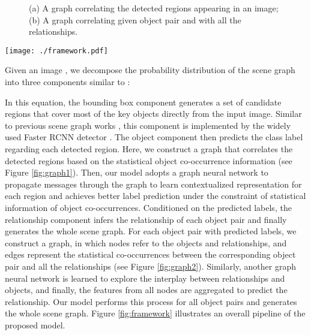 \documentclass[10pt,twocolumn,letterpaper]{article}
\begin{document}
\begin{figure}[!t]
\centering
{}
\caption{(a) A graph correlating the detected regions appearing in an image; (b) A graph correlating given object pair  and  with all the relationships.}
\end{figure}

\begin{figure*}[!t]
   \centering
   \texttt{[image: ./framework.pdf]} \caption{An overall pipeline of the knowledge-embedded routing network. Given an image, we first adopt the Faster RCNN to detect a set of regions. Then, a graph is built to correlate the regions, and a graph neural network is employed to learn contextualized representation to predict the class label for each region. For each object pair with predicted labels, we build another graph to correlate the given object pair with all the possible relationships and employ a graph neural network to infer their relationship. The process is repeated for all object pairs and the scene graph is generated.}
   \label{fig:framework}
\end{figure*}

Given an image , we decompose the probability distribution of the scene graph  into three components similar to \cite{zellers2017neural}:


In this equation, the bounding box component  generates a set of candidate regions that cover most of the key objects directly from the input image. Similar to previous scene graph works \cite{dai2017detecting,zellers2017neural}, this component is implemented by the widely used Faster RCNN detector \cite{ren2015faster}. The object component  then predicts the class label regarding each detected region. Here, we construct a graph that correlates the detected regions based on the statistical object co-occurrence information (see Figure \ref{fig:graph1}). Then, our model adopts a graph neural network \cite{scarselli2009graph,li2016gated} to propagate messages through the graph to learn contextualized representation for each region and achieves better label prediction under the constraint of statistical information of object co-occurrences. Conditioned on the predicted labels, the relationship component  infers the relationship of each object pair and finally generates the whole scene graph. For each object pair with predicted labels, we construct a graph, in which nodes refer to the objects and relationships, and edges represent the statistical co-occurrences between the corresponding object pair and all the relationships (see Figure \ref{fig:graph2}). Similarly, another graph neural network is learned to explore the interplay between relationships and objects, and finally, the features from all nodes are aggregated to predict the relationship. Our model performs this process for all object pairs and generates the whole scene graph. Figure \ref{fig:framework} illustrates an overall pipeline of the proposed model.
\end{document}

